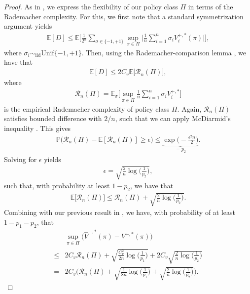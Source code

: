 \documentclass{article} %
\theoremstyle{plain}
\theoremstyle{definition}
\theoremstyle{remark}
\begin{document}
\begin{proof}
As in \citep{ Athey.2021,Frauen.2024,Hatt.2022b, Kallus.2018c}, we express the flexibility of our policy class $\Pi$ in terms of the Rademacher complexity. For this, we first note that a standard symmetrization argument yields
\begin{align}
    \mathbb{E}[D] \leq \mathbb{E}\Bigg[ \frac{1}{2^n} \sum_{\sigma \in \{-1,+1\}} \sup_{\pi \in \Pi} \Bigg| \frac{1}{n} \sum_{i=1}^n \sigma_i V_i^{+,*}(\pi) \Bigg| \Bigg],
\end{align}
where $\sigma_i \sim_\mathrm{iid} \text{Unif}\{-1, +1\}$. Then, using the Rademacher-comparison lemma \citep{Ledoux.1989}, we have that
\begin{align}
    \mathbb{E}[D]\leq 2C_v \mathbb{E}\Big[ \mathcal{R}_n({\Pi}) \Big],
\end{align}
where
\begin{align}
    \mathcal{R}_n({\Pi}) = \mathbb{E}_{\sigma}\Bigg[ \sup_{\pi \in \Pi} \frac{1}{n}\sum_{i=1}^n \sigma_i V_i^{+,*}\Bigg ]
\end{align}
is the empirical Rademacher complexity of policy class $\Pi$. Again, $\mathcal{R}_n(\Pi)$ satisfies bounded difference with $2/n$, such that we can apply McDiarmid's inequality \citep{McDiarmid.1989}. This gives
\begin{align}
    \mathbb{P}\Big( \mathcal{R}_n(\Pi)  - \mathbb{E}[\mathcal{R}_n(\Pi)] \geq \epsilon \Big) \leq \underbrace{\exp\Big( -\frac{\epsilon^2 n}{2}\Big)}_{=p_2}.
\end{align}
Solving for $\epsilon$ yields
\begin{align}
    \epsilon = \sqrt{\frac{2}{n} \log \Big( \frac{1}{p_2} \Big) },
\end{align}
such that, with probability at least $1-p_2$, we have that
\begin{align}
    \mathbb{E}\Big[\mathcal{R}_n(\Pi)\Big] \leq \mathcal{R}_n(\Pi) + \sqrt{\frac{2}{n} \log \Big( \frac{1}{p_2} \Big) }.\label{eq:diarmid2}
\end{align}
Combining  with our previous result in , we have, with probability of at least $1-p_1-p_2$, that
\begin{align}
    &\sup_{\pi \in \Pi} \Big( \hat{V}^{+,*}(\pi) -V^{+,*}(\pi) \Big)\\
    \leq& 2 C_v \mathcal{R}_n(\Pi) + \sqrt{\frac{C_v^2}{2n}\log\Big( \frac{1}{p_1}\Big)} +2C_v \sqrt{\frac{2}{n} \log \Big( \frac{1}{p_2} \Big) }\\
    =& 2 C_v \Big(  \mathcal{R}_n(\Pi) + \sqrt{\frac{1}{8n}\log\Big( \frac{1}{p_1}\Big)} + \sqrt{\frac{2}{n} \log \Big( \frac{1}{p_2} \Big) }\Big).

\end{align}
\end{proof}
\end{document}
